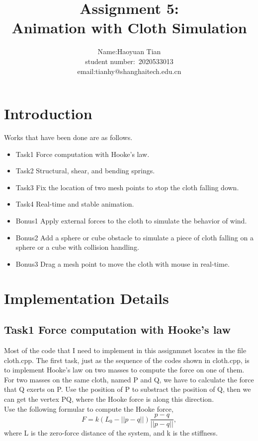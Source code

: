 \documentclass[acmtog]{acmart}
\title{Assignment 5:\\ {Animation with Cloth Simulation}}
\author{Name:\quad Haoyuan Tian  \\ student number:\ 2020533013
\\email:\quad tianhy@shanghaitech.edu.cn}
\begin{document}
\maketitle

\vspace*{2 ex}

\section{Introduction}
Works that have been done are as follows.
\begin{itemize}
	\item Task1 Force computation with Hooke's law.
	\item Task2 Structural, shear, and bending springs.
	\item Task3 Fix the location of two mesh points to stop the cloth falling down.
	\item Task4 Real-time and stable animation.
	\item Bonus1 Apply external forces to the cloth to simulate the behavior of wind.
	\item Bonus2 Add a sphere or cube obstacle to simulate a piece of cloth falling on a sphere or a cube with collision handling.
	\item Bonus3 Drag a mesh point to move the cloth with mouse in real-time.
\end{itemize}
\section{Implementation Details}

\subsection{Task1 Force computation with Hooke's law}
Most of the code that I need to implement in this assignmnet locates in the file cloth.cpp. The first task, just as the sequence of the codes shown in cloth.cpp, is to implement Hooke's law on two masses to compute the force on one of them.\\
For two masses on the same cloth, named P and Q, we have to calculate the force that Q exerts on P. Use the position of P to substract the position of Q, then we can get the vertex PQ, where the Hooke force is along this direction.\\
Use the following formular to compute the Hooke force, $$F = k(L_0-||p-q||)\frac{p-q}{||p-q||},$$
where L is the zero-force distance of the system, and k is the stiffness.
\end{document}
